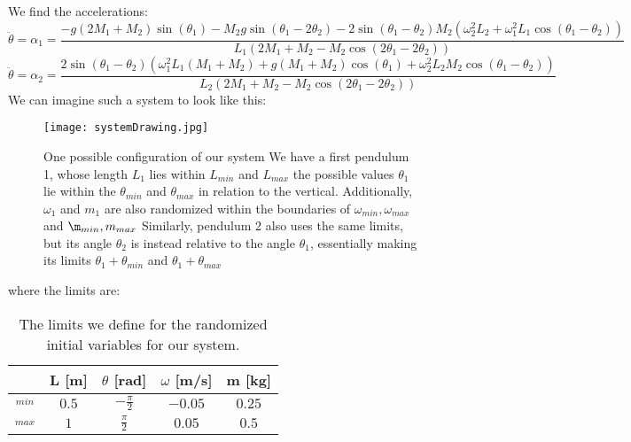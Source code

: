 \documentclass{article}
\begin{document}
We find the accelerations:
\begin{equation}
\ddot \theta = \alpha_1 = \frac{{-g(2M_1+M_2)\sin(\theta_1) - M_2g\sin(\theta_1-2\theta_2) - 2\sin(\theta_1-\theta_2)M_2(\omega_2^2L_2+\omega_1^2L_1\cos(\theta_1-\theta_2))}}{{L_1(2M_1+M_2-M_2\cos(2\theta_1-2\theta_2))}}
\end{equation}
\begin{equation}
\ddot \theta = \alpha_2 = \frac{{2\sin(\theta_1-\theta_2)(\omega_1^2L_1(M_1+M_2) + g(M_1+M_2)\cos(\theta_1) + \omega_2^2L_2M_2\cos(\theta_1-\theta_2))}}{{L_2(2M_1+M_2-M_2\cos(2\theta_1-2\theta_2))}}
\end{equation}
\newline
We can imagine such a system to look like this:
\begin{figure}[ht!]
    \centering
    \texttt{[image: systemDrawing.jpg]}
    \caption{One possible configuration of our system \newline We have a first pendulum 1, whose length $L_1$ lies within $L_{min}$ and $L_{max}$ the possible values $\theta_1$ lie within the $\theta_{min}$ and $\theta_{max}$ in relation to the vertical. Additionally, $\omega_1$ and $m_1$ are also randomized within the boundaries of $\omega_{min}, \omega_{max}$ and $\m_{min}, m_{max}$ \newline Similarly, pendulum 2 also uses the same limits, but its angle $\theta_2$ is instead relative to the angle $\theta_1$, essentially making its limits $\theta_1 + \theta_{min}$ and $\theta_1 + \theta_{max}$}
    \label{figEx}
\end{figure} \newline
where the limits are:
\begin{table}[ht!]
    \centering
    \begin{tabular}{c|c|c|c|c}
          &L [m]& $\theta$ [rad]& $\omega$ [m/s] & m [kg]  \\
          \hline
         $_{min}$& $0.5$& $-\frac{\pi}{2}$& $-0.05$& $0.25$ \\
         $_{max}$& $1$& $\frac{\pi}{2}$& $0.05$& $0.5$
    \end{tabular}
    \caption{The limits we define for the randomized initial variables for our system.}
    \label{tabEx}
\end{table}
\newpage
\end{document}
